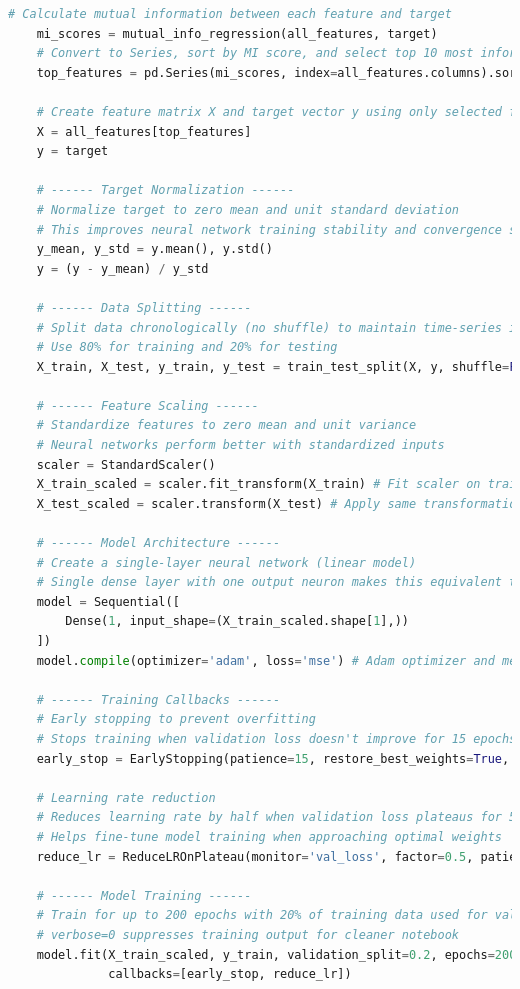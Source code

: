 \documentclass[12pt]{article}
\begin{document}
\begin{lstlisting}[language=Python]
    # Calculate mutual information between each feature and target
    mi_scores = mutual_info_regression(all_features, target)
    # Convert to Series, sort by MI score, and select top 10 most informative features
    top_features = pd.Series(mi_scores, index=all_features.columns).sort_values(ascending=False).head(10).index.tolist()

    # Create feature matrix X and target vector y using only selected features
    X = all_features[top_features]
    y = target

    # ------ Target Normalization ------
    # Normalize target to zero mean and unit standard deviation
    # This improves neural network training stability and convergence speed
    y_mean, y_std = y.mean(), y.std()
    y = (y - y_mean) / y_std

    # ------ Data Splitting ------
    # Split data chronologically (no shuffle) to maintain time-series integrity
    # Use 80% for training and 20% for testing
    X_train, X_test, y_train, y_test = train_test_split(X, y, shuffle=False, test_size=0.2)

    # ------ Feature Scaling ------
    # Standardize features to zero mean and unit variance
    # Neural networks perform better with standardized inputs
    scaler = StandardScaler()
    X_train_scaled = scaler.fit_transform(X_train) # Fit scaler on training data only to prevent data leakage
    X_test_scaled = scaler.transform(X_test) # Apply same transformation to test data

    # ------ Model Architecture ------
    # Create a single-layer neural network (linear model)
    # Single dense layer with one output neuron makes this equivalent to linear regression
    model = Sequential([
        Dense(1, input_shape=(X_train_scaled.shape[1],))
    ])
    model.compile(optimizer='adam', loss='mse') # Adam optimizer and mean squared error loss function

    # ------ Training Callbacks ------
    # Early stopping to prevent overfitting
    # Stops training when validation loss doesn't improve for 15 epochs
    early_stop = EarlyStopping(patience=15, restore_best_weights=True, monitor='val_loss')
    
    # Learning rate reduction
    # Reduces learning rate by half when validation loss plateaus for 5 epochs
    # Helps fine-tune model training when approaching optimal weights
    reduce_lr = ReduceLROnPlateau(monitor='val_loss', factor=0.5, patience=5, min_lr=1e-5, verbose=0)

    # ------ Model Training ------
    # Train for up to 200 epochs with 20% of training data used for validation
    # verbose=0 suppresses training output for cleaner notebook
    model.fit(X_train_scaled, y_train, validation_split=0.2, epochs=200, verbose=0,
              callbacks=[early_stop, reduce_lr])


\end{lstlisting}
\end{document}
